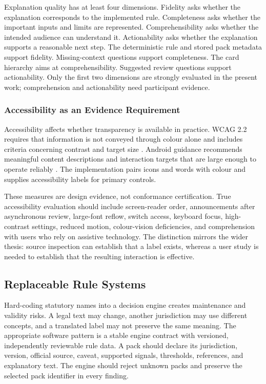 Explanation quality has at least four dimensions. Fidelity asks whether the explanation corresponds to the implemented rule. Completeness asks whether the important inputs and limits are represented. Comprehensibility asks whether the intended audience can understand it. Actionability asks whether the explanation supports a reasonable next step. The deterministic rule and stored pack metadata support fidelity. Missing-context questions support completeness. The card hierarchy aims at comprehensibility. Suggested review questions support actionability. Only the first two dimensions are strongly evaluated in the present work; comprehension and actionability need participant evidence.

\subsubsection{Accessibility as an Evidence Requirement}

Accessibility affects whether transparency is available in practice. WCAG 2.2 requires that information is not conveyed through colour alone and includes criteria concerning contrast and target size \cite{wcag22}. Android guidance recommends meaningful content descriptions and interaction targets that are large enough to operate reliably \cite{androidaccess}. The implementation pairs icons and words with colour and supplies accessibility labels for primary controls.

These measures are design evidence, not conformance certification. True accessibility evaluation should include screen-reader order, announcements after asynchronous review, large-font reflow, switch access, keyboard focus, high-contrast settings, reduced motion, colour-vision deficiencies, and comprehension with users who rely on assistive technology. The distinction mirrors the wider thesis: source inspection can establish that a label exists, whereas a user study is needed to establish that the resulting interaction is effective.

\subsection{Replaceable Rule Systems}

Hard-coding statutory names into a decision engine creates maintenance and validity risks. A legal text may change, another jurisdiction may use different concepts, and a translated label may not preserve the same meaning. The appropriate software pattern is a stable engine contract with versioned, independently reviewable rule data. A pack should declare its jurisdiction, version, official source, caveat, supported signals, thresholds, references, and explanatory text. The engine should reject unknown packs and preserve the selected pack identifier in every finding.

